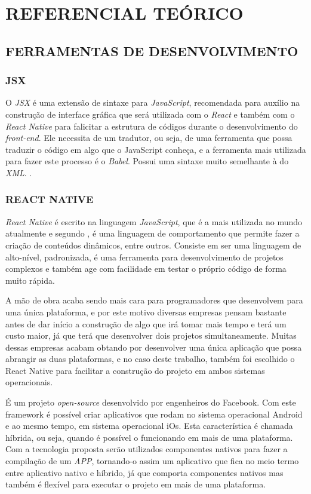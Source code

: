 
\chapter{REFERENCIAL TEÓRICO}
\label{chap:ref_teo}

\section{FERRAMENTAS DE DESENVOLVIMENTO}

\subsection{JSX}
O \textit{JSX} é uma extensão de sintaxe para \textit{JavaScript}, recomendada para auxílio na construção de interface gráfica que será utilizada com o \textit{React} e também com o \textit{React Native} para falicitar a estrutura de códigos durante o desenvolvimento do \textit{front-end}. Ele necessita de um tradutor, ou seja, de uma ferramenta que possa traduzir o código em algo que o JavaScript conheça, e a ferramenta mais utilizada para fazer este processo é o \textit{Babel}. Possui uma sintaxe muito semelhante à do \textit{XML}.  
\cite{jsx}.

\subsection{REACT NATIVE}
\textit{React Native} é escrito na linguagem \textit{JavaScript}, que é a mais utilizada no mundo atualmente e segundo , é uma linguagem de comportamento que permite fazer a criação de conteúdos dinâmicos, entre outros. Consiste em ser uma linguagem de alto-nível, padronizada, é uma ferramenta para desenvolvimento de projetos complexos e também age com facilidade em testar o próprio código de forma muito rápida. 

A mão de obra acaba sendo mais cara para programadores que desenvolvem para uma única plataforma, e por este motivo diversas empresas pensam bastante antes de dar início a construção de algo que irá tomar mais tempo e terá um custo maior, já que terá que desenvolver dois projetos simultaneamente. Muitas dessas empresas acabam obtando por desenvolver uma única aplicação que possa abrangir as duas plataformas, e no caso deste trabalho, também foi escolhido o React Native para facilitar a construção do projeto em ambos sistemas operacionais. 

É um projeto \textit{open-source} desenvolvido por engenheiros do Facebook. Com este framework é possível criar aplicativos que rodam no sistema operacional Android e ao mesmo tempo, em sistema operacional iOs. Esta característica é chamada híbrida, ou seja, quando é possível o funcionando em mais de uma plataforma. Com a tecnologia proposta serão utilizados componentes nativos para fazer a compilação de um \textit{APP}, tornando-o assim um aplicativo que fica no meio termo entre aplicativo nativo e híbrido, já que comporta componentes nativos mas também é flexível para executar o projeto em mais de uma plataforma.


